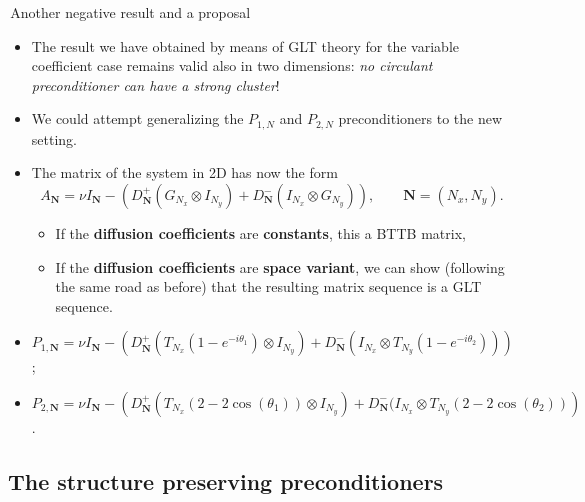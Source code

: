 \documentclass[aspectratio=169,xcolor=dvipsnames]{beamer}
\begin{document}
	\begin{frame}{\faSadTear\,Another negative result and a proposal}
	\begin{itemize}
		\item[\alert{\faBomb}] The result we have obtained by means of GLT theory for the variable coefficient case remains valid also in two dimensions: \emph{no circulant preconditioner can have a strong cluster}!
		
		\item[\faLightbulb]<2-> We could attempt generalizing the $P_{1,N}$ and $P_{2,N}$ preconditioners to the new setting.
		
		\item[\faCogs]<3-> The matrix of the system in 2D has now the form
		\[
		A_\mathbf{N} = \nu I_\mathbf{N} - \left( D_\mathbf{N}^+ (G_{N_x} \otimes I_{N_y}) +  D_\mathbf{N}^- (I_{N_x} \otimes G_{N_y}) \right), \qquad \mathbf{N} = (N_x,N_y).
		\]
		\begin{itemize}\vspace{-1.5em}
			\item[\faDoorOpen]\normalsize If the \textbf{diffusion coefficients} are \textbf{constants}, this a BTTB matrix,
			\item[\faDoorOpen]\normalsize If the \textbf{diffusion coefficients} are \textbf{space variant}, we can show (following the same road as before) that the resulting matrix sequence is a GLT sequence.
		\end{itemize}
		\item[\faCogs]<4-> $P_{1,\mathbf{N}} = \nu I_\mathbf{N} -\left( D_\mathbf{N}^+ (T_{N_x}(1-e^{-i\theta_1}) \otimes I_{N_y}) +  D_\mathbf{N}^- (I_{N_x} \otimes T_{N_y}(1-e^{-i\theta_2})) \right)$; 
		\item[\faCogs]<4-> $P_{2,\mathbf{N}} = \nu I_\mathbf{N} -\left( D_\mathbf{N}^+ (T_{N_x}(2-2\cos(\theta_1)) \otimes I_{N_y}) +  D_\mathbf{N}^- (I_{N_x} \otimes T_{N_y}(2-2\cos(\theta_2)) \right)$.
	\end{itemize}

	\end{frame}

	\subsection{The structure preserving preconditioners}
\end{document}
